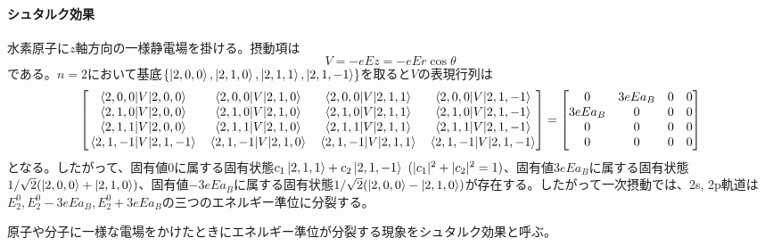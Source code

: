 \paragraph{シュタルク効果}
    水素原子に$z$軸方向の一様静電場を掛ける。摂動項は
        \[V = -eEz = -eEr\cos\theta\]
    である。$n = 2$において基底$\{\ket{2,0,0}, \ket{2,1,0}, \ket{2,1,1}, \ket{2,1,-1}\}$を取ると$V$の表現行列は
    \[
        \begin{bmatrix}
            \mel{2,0,0}{V}{2,0,0} & \mel{2,0,0}{V}{2,1,0} & \mel{2,0,0}{V}{2,1,1} & \mel{2,0,0}{V}{2,1,-1}\\
            \mel{2,1,0}{V}{2,0,0} & \mel{2,1,0}{V}{2,1,0} & \mel{2,1,0}{V}{2,1,1} & \mel{2,1,0}{V}{2,1,-1}\\
            \mel{2,1,1}{V}{2,0,0} & \mel{2,1,1}{V}{2,1,0} & \mel{2,1,1}{V}{2,1,1} & \mel{2,1,1}{V}{2,1,-1}\\
            \mel{2,1,-1}{V}{2,1,-1} & \mel{2,1,-1}{V}{2,1,0} & \mel{2,1,-1}{V}{2,1,1} & \mel{2,1,-1}{V}{2,1,-1}
        \end{bmatrix}
        =
        \begin{bmatrix}
            0 & 3eEa_B & 0 & 0\\
            3eEa_B & 0 & 0 & 0\\
            0 & 0 & 0 & 0\\
            0 & 0 & 0 & 0
        \end{bmatrix}
    \]
    となる。したがって、固有値$0$に属する固有状態$c_1\ket{2,1,1} + c_2\ket{2,1,-1}\ (|c_1|^2 + |c_2|^2 = 1)$、固有値$3eEa_B$に属する固有状態$1/\sqrt{2}(\ket{2,0,0} + \ket{2,1,0})$、固有値$-3eEa_B$に属する固有状態$1/\sqrt{2}(\ket{2,0,0} - \ket{2,1,0})$が存在する。したがって一次摂動では、2s, 2p軌道は$E_2^0, E_2^0 - 3eEa_B, E_2^0 + 3eEa_B$の三つのエネルギー準位に分裂する。

    原子や分子に一様な電場をかけたときにエネルギー準位が分裂する現象をシュタルク効果と呼ぶ。


